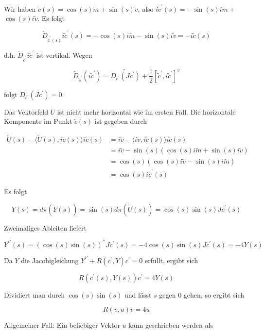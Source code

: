 \documentclass[10pt]{article}
\begin{document}
Wir haben $\tilde{c}(s)=\cos (s) \tilde{m}+\sin (s) \tilde{v}$, also $i \tilde{c}^{\prime}(s)=-\sin (s) i \tilde{m}+$ $\cos (s) i \tilde{v}$. Es folgt

$$
\tilde{D}_{\tilde{c}^{\prime}(s)} i \tilde{c}^{\prime}(s)=-\cos (s) i \tilde{m}-\sin (s) i \tilde{v}=-i \tilde{c}(s)
$$

d.h. $\tilde{D}_{\tilde{c}^{\prime}} i \tilde{c}^{\prime}$ ist vertikal. Wegen

$$
\tilde{D}_{\tilde{c}^{\prime}}\left(i \tilde{c}^{\prime}\right)=\widetilde{D_{c^{\prime}}\left(J c^{\prime}\right)}+\frac{1}{2}\left[\tilde{c}^{\prime}, i \tilde{c}^{\prime}\right]^{v}
$$

folgt $D_{c^{\prime}}\left(J c^{\prime}\right)=0$.

Das Vektorfeld $\tilde{U}$ ist nicht mehr horizontal wie im ersten Fall. Die horizontale Komponente im Punkt $\tilde{c}(s)$ ist gegeben durch

$$
\begin{aligned}
\tilde{U}(s)-\langle\tilde{U}(s), i \tilde{c}(s)\rangle i \tilde{c}(s) & =i \tilde{v}-\langle i \tilde{v}, i \tilde{c}(s)\rangle i \tilde{c}(s) \\
& =i \tilde{v}-\sin (s)(\cos (s) i \tilde{m}+\sin (s) i \tilde{v}) \\
& =\cos (s)(\cos (s) i \tilde{v}-\sin (s) i \tilde{m}) \\
& =\cos (s) i \tilde{c}^{\prime}(s)
\end{aligned}
$$

Es folgt


\begin{equation*}
Y(s)=d \pi(\tilde{Y}(s))=\sin (s) d \pi(\tilde{U}(s))=\cos (s) \sin (s) J c^{\prime}(s) \tag{10}
\end{equation*}


Zweimaliges Ableiten liefert

$$
Y^{\prime \prime}(s)=(\cos (s) \sin (s))^{\prime \prime} J c^{\prime}(s)=-4 \cos (s) \sin (s) J c^{\prime}(s)=-4 Y(s)
$$

Da $Y$ die Jacobigleichung $Y^{\prime \prime}+R\left(c^{\prime}, Y\right) c^{\prime}=0$ erfüllt, ergibt sich

$$
R\left(c^{\prime}(s), Y(s)\right) c^{\prime}=4 Y(s)
$$

Dividiert man durch $\cos (s) \sin (s)$ und lässt $s$ gegen 0 gehen, so ergibt sich

$$
R(v, u) v=4 u
$$

Allgemeiner Fall: Ein beliebiger Vektor $u$ kann geschrieben werden als
\end{document}
